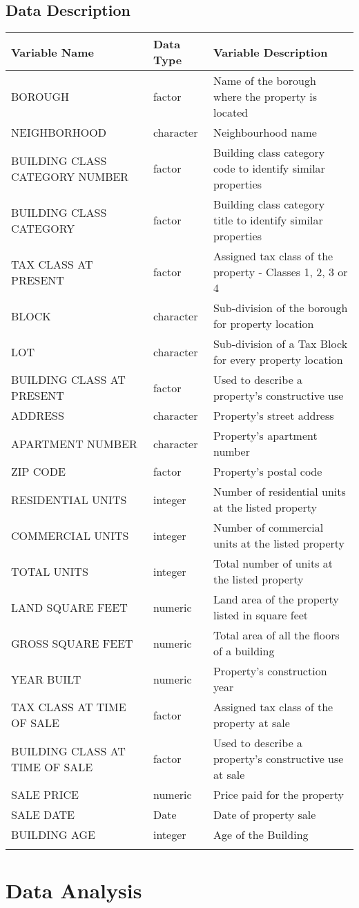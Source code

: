 \documentclass[
  a3paper,
]{article}
\begin{document}
\hypertarget{data-description}{%
\subsection{\texorpdfstring{\textbf{Data
Description}}{Data Description}}\label{data-description}}

\begin{longtable}[]{@{}lll@{}}
\toprule
Variable Name & Data Type & Variable Description\tabularnewline
\midrule
\endhead
BOROUGH & factor & Name of the borough where the property is
located\tabularnewline
NEIGHBORHOOD & character & Neighbourhood name\tabularnewline
BUILDING CLASS CATEGORY NUMBER & factor & Building class category code
to identify similar properties\tabularnewline
BUILDING CLASS CATEGORY & factor & Building class category title to
identify similar properties\tabularnewline
TAX CLASS AT PRESENT & factor & Assigned tax class of the property -
Classes 1, 2, 3 or 4\tabularnewline
BLOCK & character & Sub-division of the borough for property
location\tabularnewline
LOT & character & Sub-division of a Tax Block for every property
location\tabularnewline
BUILDING CLASS AT PRESENT & factor & Used to describe a property's
constructive use\tabularnewline
ADDRESS & character & Property's street address\tabularnewline
APARTMENT NUMBER & character & Property's apartment
number\tabularnewline
ZIP CODE & factor & Property's postal code\tabularnewline
RESIDENTIAL UNITS & integer & Number of residential units at the listed
property\tabularnewline
COMMERCIAL UNITS & integer & Number of commercial units at the listed
property\tabularnewline
TOTAL UNITS & integer & Total number of units at the listed
property\tabularnewline
LAND SQUARE FEET & numeric & Land area of the property listed in square
feet\tabularnewline
GROSS SQUARE FEET & numeric & Total area of all the floors of a
building\tabularnewline
YEAR BUILT & numeric & Property's construction year\tabularnewline
TAX CLASS AT TIME OF SALE & factor & Assigned tax class of the property
at sale\tabularnewline
BUILDING CLASS AT TIME OF SALE & factor & Used to describe a property's
constructive use at sale\tabularnewline
SALE PRICE & numeric & Price paid for the property\tabularnewline
SALE DATE & Date & Date of property sale\tabularnewline
BUILDING AGE & integer & Age of the Building\tabularnewline
\newpage & &\tabularnewline
\bottomrule
\end{longtable}

\hypertarget{data-analysis}{%
\section{\texorpdfstring{\textbf{Data
Analysis}}{Data Analysis}}\label{data-analysis}}
\end{document}
